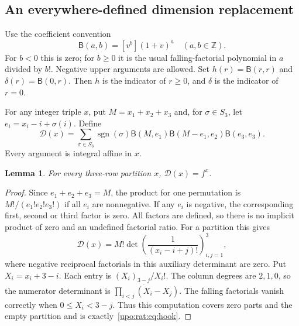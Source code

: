 \documentclass[11pt,letterpaper]{article}
\newtheorem{lemma}[theorem]{Lemma}
\theoremstyle{remark}\newtheorem{remark}[theorem]{Remark}
\numberwithin{equation}{section}
\newcommand{\sgn}{\operatorname{sgn}}
\begin{document}
\subsection{An everywhere-defined dimension replacement}
Use the coefficient convention
\begin{equation}\label{upo:rat:eq:Binom}
\mathsf B(a,b)=[v^b](1+v)^a\quad(a,b\in\mathbb Z).
\end{equation}
For $b<0$ this is zero; for $b\ge0$ it is the usual falling-factorial
polynomial in $a$ divided by $b!$. Negative upper arguments are allowed.
Set $h(r)=\mathsf B(r,r)$ and $\delta(r)=\mathsf B(0,r)$.
Then $h$ is the indicator of $r\ge0$, and $\delta$ is the indicator of
$r=0$.

For any integer triple $x$, put $M=x_1+x_2+x_3$ and, for $\sigma\in S_3$, let
$e_i=x_i-i+\sigma(i)$. Define
\begin{equation}\label{upo:rat:eq:Dhat}
\mathcal D(x)=\sum_{\sigma\in S_3}\sgn(\sigma)
\mathsf B(M,e_1)\mathsf B(M-e_1,e_2)\mathsf B(e_3,e_3).
\end{equation}
Every argument is integral affine in $x$.

\begin{lemma}\label{upo:rat:lem:dimension}
For every three-row partition $x$, $\mathcal D(x)=f^x$.
\end{lemma}
\begin{proof}
Since $e_1+e_2+e_3=M$, the product for one permutation is
$M!/(e_1!e_2!e_3!)$ if all $e_i$ are nonnegative. If any $e_i$ is negative,
the corresponding first, second or third factor is zero. All factors
are defined, so there is no implicit product of zero and an undefined
factorial ratio. For a partition this gives
\[
\mathcal D(x)=M!\det\left(\frac1{(x_i-i+j)!}\right)_{i,j=1}^3,
\]
where negative reciprocal factorials in this auxiliary determinant are
zero. Put $X_i=x_i+3-i$. Each entry is
$(X_i)_{\underline{3-j}}/X_i!$. The column degrees are $2,1,0$, so the
numerator determinant is $\prod_{i<j}(X_i-X_j)$. The falling factorials
vanish correctly when $0\le X_i<3-j$. Thus this computation covers zero
parts and the empty partition and is exactly~\eqref{upo:rat:eq:hook}.
\end{proof}
\end{document}
